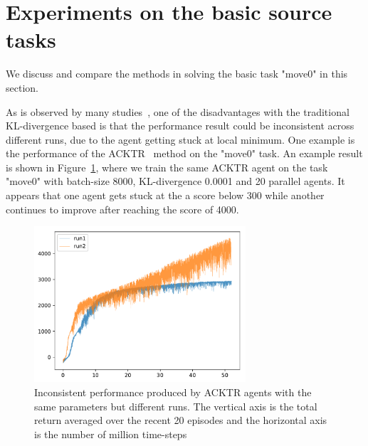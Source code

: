 
\section{Experiments on the basic source tasks}

We discuss and compare the methods in solving the basic task "move0" in this section.

As is observed by many studies~\cite{henderson2017matters}, one of the disadvantages with the traditional KL-divergence based is that the performance result could be inconsistent across different runs, due to the agent getting stuck at local minimum. One example is the performance of the ACKTR~\cite{wu2017scalable} method on the "move0" task. An example result is shown in Figure~\ref{fig_acktr_reprod}, where we train the same ACKTR agent on the task "move0" with batch-size 8000, KL-divergence 0.0001 and  20 parallel agents. It appears that one agent gets stuck at the a score below 300 while another continues to improve after reaching the score of 4000. 
\begin{figure}[!htbp]
	\includegraphics[width=0.7\textwidth]{images/rec_acktr_reprod}
	\centering
	\caption{Inconsistent performance produced by ACKTR agents with the same  parameters but different runs. The vertical axis is the total return averaged over the recent 20 episodes and the horizontal axis is the number of million time-steps}\label{fig_acktr_reprod}
\end{figure}

